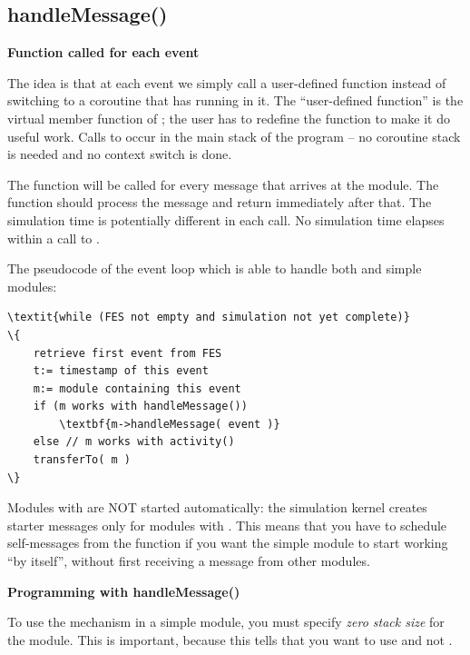 \subsection{handleMessage()}

\textbf{Function called for each event}


The idea is that at each event we simply call a
user-defined function instead of switching to a coroutine that has
 running in it. The ``user-defined function'' is the
 virtual member
function of ; the user has to redefine the
function to make it do useful work.  Calls to 
occur in the main stack of the program -- no coroutine stack is needed
and no context switch is done.


The  function will be called for every message
that arrives at the module. The function should process the message
and return immediately after that. The simulation time is potentially
different in each call. No simulation time elapses within a call
to .


The pseudocode of the event loop which is able to handle both 
and  simple modules:


\begin{Verbatim}[commandchars=\\\{\}]
\textit{while (FES not empty and simulation not yet complete)}
\{
    retrieve first event from FES
    t:= timestamp of this event
    m:= module containing this event
    if (m works with handleMessage())
        \textbf{m->handleMessage( event )}
    else // m works with activity()
    transferTo( m )
\}
\end{Verbatim}


Modules with  are NOT started automatically:
the simulation kernel creates starter messages
only for modules with . This means that you have to
schedule self-messages from the
 function if you want the 
simple module to start working ``by itself'', without first receiving
a message from other modules.


\textbf{Programming with handleMessage()}


To use the  mechanism in a
simple module, you must specify \textit{zero
  stack size} for the module. This is
important, because this tells {\opp} that you want to use
 and not .

